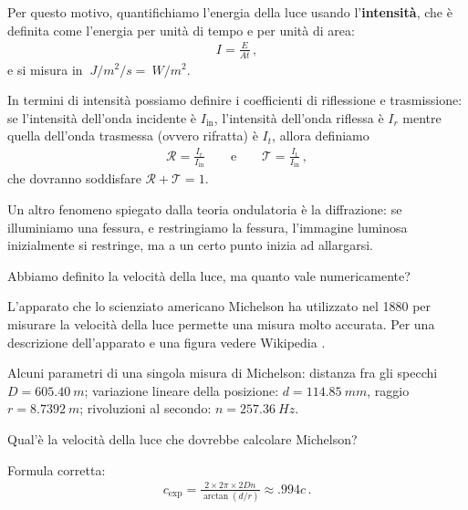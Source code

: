 \documentclass{article}
\begin{document}
Per questo motivo, quantifichiamo l'energia della luce usando l'\textbf{intensità}, che è definita come l'energia per unità di tempo e per unità di area: 
%
\begin{align}
I = \frac{E}{A t}
\,,
\end{align}
%
e si misura in \(\SI{}{J / m^2 / s}  = \SI{}{W/m^2}\). 

In termini di intensità possiamo definire i coefficienti di riflessione e trasmissione: se l'intensità dell'onda incidente è \(I _{\text{in}}\), l'intensità dell'onda riflessa è \(I_{r}\) mentre quella dell'onda trasmessa (ovvero rifratta) è \(I_{t}\), allora definiamo 
%
\begin{align}
\mathcal{R} = \frac{I_r}{I _{\text{in}}}
\qquad \text{e} \qquad
\mathcal{T} = \frac{I_t}{I _{\text{in}}}
\,,
\end{align}
%
che dovranno soddisfare \(\mathcal{R} + \mathcal{T} = 1\).

Un altro fenomeno spiegato dalla teoria ondulatoria è la diffrazione: se illuminiamo una fessura, e restringiamo la fessura, l'immagine luminosa inizialmente si restringe, ma a un certo punto inizia ad allargarsi.

Abbiamo definito la velocità della luce, ma quanto vale numericamente? 

\begin{exo}


L'apparato che lo scienziato americano Michelson ha utilizzato nel 1880 \cite[]{michelsonExperimentalDeterminationVelocity1880} per misurare la velocità della luce permette una misura molto accurata.
Per una descrizione dell'apparato e una figura vedere Wikipedia \cite[figura 3]{wikipediacontributorsFizeauFoucaultApparatus2019}.

Alcuni parametri di una singola misura di Michelson: distanza fra gli specchi \(D = \SI{605.40}{m}\); variazione lineare della posizione: \(d = \SI{114.85}{mm}\), raggio \(r = \SI{8.7392}{m}\); rivoluzioni al secondo: \(n = \SI{257.36}{Hz}\).

Qual'è la velocità della luce che dovrebbe calcolare Michelson?

Formula corretta: 
%
\begin{align}
c _{\text{exp}} = \frac{2 \times 2 \pi \times 2 D n}{\arctan(d / r)} \approx \num{.994} c
\,.
\end{align}
\end{exo}
\end{document}
